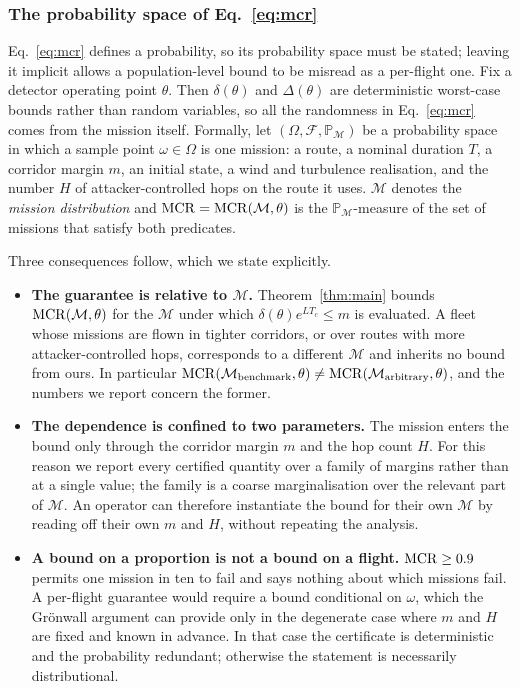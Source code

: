 \subsubsection*{The probability space of Eq.~\eqref{eq:mcr}}
\label{sec:probspace}
Eq.~\eqref{eq:mcr} defines a probability, so its probability space must be
stated; leaving it implicit allows a population-level bound to be misread as a
per-flight one. Fix a detector operating point $\theta$. Then
$\delta(\theta)$ and $\Delta(\theta)$ are deterministic worst-case bounds rather
than random variables, so all the randomness in Eq.~\eqref{eq:mcr} comes
from the mission itself. Formally, let $(\Omega,\mathcal{F},\mathbb{P}_{\mathcal{M}})$
be a probability space in which a sample point $\omega\in\Omega$ is one mission:
a route, a nominal duration $T$, a corridor margin $m$, an initial state, a wind
and turbulence realisation, and the number $H$ of attacker-controlled hops on
the route it uses. $\mathcal{M}$ denotes the \emph{mission
distribution} and $\mathrm{MCR}=\mathrm{MCR}(\mathcal{M},\theta)$ is the
$\mathbb{P}_{\mathcal{M}}$-measure of the set of missions that satisfy both predicates.

Three consequences follow, which we state explicitly.

\begin{itemize}
\item \textbf{The guarantee is relative to $\mathcal{M}$.} Theorem~\ref{thm:main}
bounds $\mathrm{MCR}(\mathcal{M},\theta)$ for the $\mathcal{M}$ under which
$\delta(\theta)e^{LT_c}\le m$ is evaluated. A fleet whose missions are flown in
tighter corridors, or over routes with more attacker-controlled hops,
corresponds to a different $\mathcal{M}$ and inherits no bound from ours. In
particular
$\mathrm{MCR}(\mathcal{M}_{\text{benchmark}},\theta)\neq\mathrm{MCR}(\mathcal{M}_{\text{arbitrary}},\theta)$,
and the numbers we report concern the former.
\item \textbf{The dependence is confined to two parameters.} The mission enters
the bound only through the corridor margin $m$ and the hop count $H$. For this
reason we report every certified quantity over a family of margins rather than
at a single value; the family is a coarse marginalisation over the relevant part
of $\mathcal{M}$. An operator can therefore instantiate the bound for their own
$\mathcal{M}$ by reading off their own $m$ and $H$, without repeating the
analysis.
\item \textbf{A bound on a proportion is not a bound on a flight.} $\mathrm{MCR}\ge0.9$
permits one mission in ten to fail and says nothing about which missions fail. A
per-flight guarantee would require a bound conditional on $\omega$, which the
Gr\"onwall argument can provide only in the degenerate case where $m$ and $H$ are
fixed and known in advance. In that case the certificate is deterministic and
the probability redundant; otherwise the statement is necessarily
distributional.
\end{itemize}

